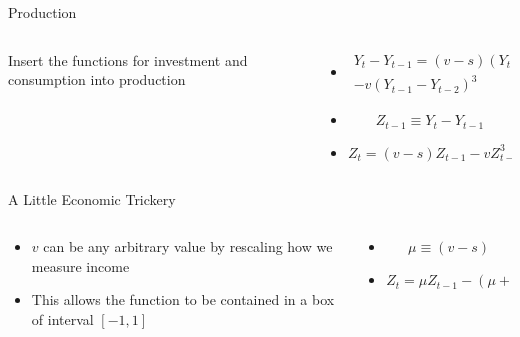 \documentclass{beamer}
\begin{document}
\begin{frame}{Production}
	\begin{columns}
		\begin{column}{0.3\textwidth}
			\centering
			Insert the functions for investment and consumption into production
		\end{column}
		\begin{column}{0.7\textwidth}
			\begin{itemize}
				\item
					\begin{equation*}
						\begin{split}
						Y_t-Y_{t-1}=(v-s)(Y_{t-1}-Y_{t-2})\\
						-v(Y_{t-1}-Y_{t-2})^3
					\end{split}
					\end{equation*}

				\item
					\begin{equation*}
						Z_{t-1}\equiv Y_{t}-Y_{t-1}
					\end{equation*}

				\item
					\begin{equation*}
						Z_t=(v-s)Z_{t-1}-vZ^3_{t-1}
					\end{equation*}
			\end{itemize}
		\end{column}
	\end{columns}
\end{frame}

\begin{frame}{A Little Economic Trickery}
	\begin{columns}
		\begin{column}{0.5\textwidth}
			\begin{itemize}
				\item
					\(v\) can be any arbitrary value by rescaling how we measure income
				\item
					This allows the function to be contained in a box of interval \([-1,1]\)
			\end{itemize}
		\end{column}
		\begin{column}{0.5\textwidth}
			\begin{itemize}
				\item
					\begin{equation*}
						\mu\equiv(v-s)
					\end{equation*}

				\item
					\begin{equation*}
						Z_t=\mu Z_{t-1}-(\mu+1)Z^3_{t-1}
					\end{equation*}
			\end{itemize}
		\end{column}
	\end{columns}
\end{frame}
\end{document}
